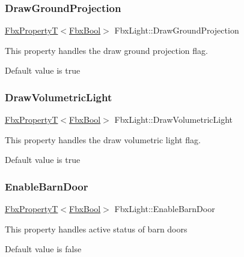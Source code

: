 \subsubsection{\texorpdfstring{Draw\+Ground\+Projection}{DrawGroundProjection}}
{\footnotesize\ttfamily \hyperlink{class_fbx_property_t}{Fbx\+PropertyT}$<$\hyperlink{fbxtypes_8h_a92e0562b2fe33e76a242f498b362262e}{Fbx\+Bool}$>$ Fbx\+Light\+::\+Draw\+Ground\+Projection}

This property handles the draw ground projection flag.

Default value is true \mbox{\label{class_fbx_light_a80eac74312e16415e3bfc8923a2ae98b}} 
\subsubsection{\texorpdfstring{Draw\+Volumetric\+Light}{DrawVolumetricLight}}
{\footnotesize\ttfamily \hyperlink{class_fbx_property_t}{Fbx\+PropertyT}$<$\hyperlink{fbxtypes_8h_a92e0562b2fe33e76a242f498b362262e}{Fbx\+Bool}$>$ Fbx\+Light\+::\+Draw\+Volumetric\+Light}

This property handles the draw volumetric light flag.

Default value is true \mbox{\label{class_fbx_light_add61baef63184934eeb71ede6328354c}} 
\subsubsection{\texorpdfstring{Enable\+Barn\+Door}{EnableBarnDoor}}
{\footnotesize\ttfamily \hyperlink{class_fbx_property_t}{Fbx\+PropertyT}$<$\hyperlink{fbxtypes_8h_a92e0562b2fe33e76a242f498b362262e}{Fbx\+Bool}$>$ Fbx\+Light\+::\+Enable\+Barn\+Door}

This property handles active status of barn doors

Default value is false \mbox{\label{class_fbx_light_a65848a9a9d7afb4c576efa5376138a06}} 
